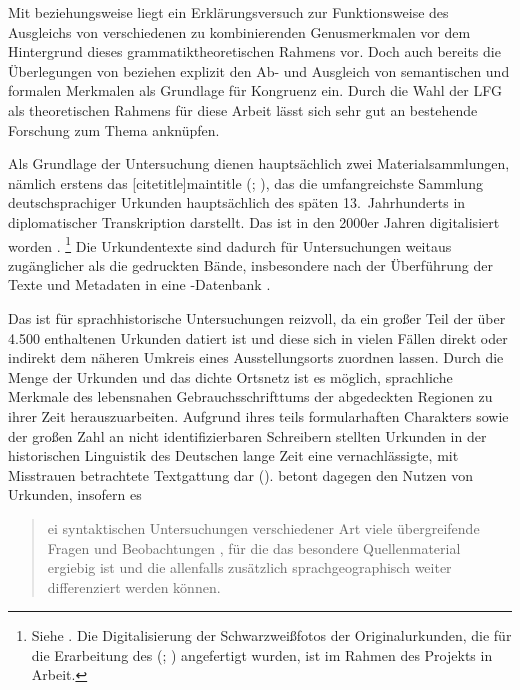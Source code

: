 Mit \citet[Kapitel~8]{wechslerzlatic2003} beziehungsweise \citet{wechsler2009}
liegt ein Erklärungsversuch zur Funktionsweise des Ausgleichs von verschiedenen
zu kombinierenden Genusmerkmalen vor dem Hintergrund dieses
grammatik\-theoretischen Rahmens vor. Doch auch bereits die Überlegungen von
\citet[237--264]{askedal1973} beziehen explizit den Ab- und Ausgleich von
semantischen und formalen Merkmalen als Grundlage für Kongruenz ein. Durch die
Wahl der LFG als theoretischen Rahmens für diese Arbeit lässt sich sehr gut an
bestehende Forschung zum Thema anknüpfen.

Als Grundlage der Untersuchung dienen hauptsächlich zwei Materialsammlungen,
nämlich erstens das [citetitle]{maintitle} (\CAO{};
\nosh\cites{cao1,cao2,cao3,cao4,caor,cao5}), das die umfangreichste Sammlung
deutschsprachiger Urkunden hauptsächlich des späten 13.~Jahrhunderts in
diplomatischer Transkription darstellt. Das \CAO{} ist in den 2000er Jahren
digitalisiert worden \autocite{cao-online}.%
%
	\footnote{Siehe . Die Digitalisierung der
		Schwarzweißfotos der Originalurkunden, die für die Erarbeitung des
		 (\WMU{};
		\nosh\cites{wmu1,wmu2,wmu3}) angefertigt wurden, ist im Rahmen des
		Projekts  in Arbeit.}
%
Die Urkundentexte sind dadurch für Untersuchungen weitaus zugänglicher als die
gedruckten Bände, insbesondere nach der Überführung der Texte und Metadaten in
eine -Datenbank
\autocite[vgl.][]{beckerschallert2021,beckerschallert2022b}.

Das \CAO{} ist für sprachhistorische Untersuchungen reizvoll, da ein
großer Teil der über 4.500 enthaltenen Urkunden datiert ist und diese sich in
vielen Fällen direkt oder indirekt dem näheren Umkreis eines Ausstellungsorts
zuordnen lassen. Durch die Menge der Urkunden und das dichte Ortsnetz ist es
möglich, sprachliche Merkmale des lebensnahen Gebrauchsschrifttums der
abgedeckten Regionen zu ihrer Zeit herauszuarbeiten. Aufgrund ihres teils
formularhaften Charakters sowie der großen Zahl an nicht identifizierbaren
Schreibern stellten Urkunden in der historischen Linguistik des Deutschen lange
Zeit eine vernachlässigte, mit Misstrauen betrachtete Textgattung dar
(). \citet[22]{schulze2011} betont dagegen den
Nutzen von Urkunden, insofern es \blockquote{ei syntaktischen
Untersuchungen verschiedener Art \textelp{} viele übergreifende Fragen und
Beobachtungen , für die das besondere Quellenmaterial ergiebig
ist und die allenfalls zusätzlich sprachgeographisch weiter differenziert
werden können.}

